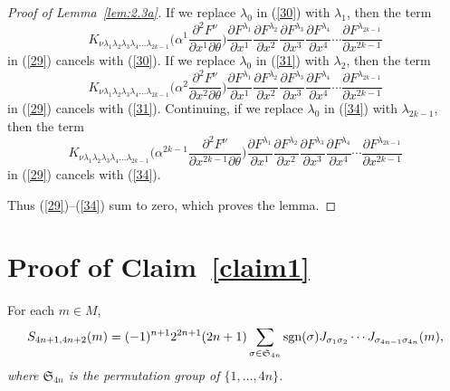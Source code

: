 \documentclass[10pt,a4paper]{amsart}
\numberwithin{equation}{section}
\theoremstyle{definition}
\newcommand{\sgn}{{\rm sgn}}
\begin{document}
\begin{proof}[Proof of Lemma~\ref{lem:2.3a}]
If we replace $\lambda_0$ in (\ref{30}) with $\lambda_1$, then the term
\[K_{\nu\lambda_1\lambda_2\lambda_3\lambda_4\dots\lambda_{2k-1}}\biggl(\alpha^1 \frac{\partial^2F^\nu}{\partial x^1\partial\theta}\biggr)\frac{\partial F^{\lambda_1}}{\partial x^1}\frac{\partial F^{\lambda_2}}{\partial x^2}
\frac{\partial F^{\lambda_3}}{\partial x^3}\frac{\partial F^{\lambda_4}}{\partial x^4}\cdots
\frac{\partial F^{\lambda_{2k-1}}}{\partial x^{2k-1}}\]
in (\ref{29}) cancels with (\ref{30}).
If we replace $\lambda_0$ in (\ref{31}) with $\lambda_2$, then the term
\[K_{\nu\lambda_1\lambda_2\lambda_3\lambda_4\dots\lambda_{2k-1}}\biggl(\alpha^2 \frac{\partial^2F^\nu}{\partial x^2\partial\theta}\biggr)\frac{\partial F^{\lambda_1}}{\partial x^1}\frac{\partial F^{\lambda_2}}{\partial x^2}
\frac{\partial F^{\lambda_3}}{\partial x^3}\frac{\partial F^{\lambda_4}}{\partial x^4}\cdots
\frac{\partial F^{\lambda_{2k-1}}}{\partial x^{2k-1}}\]
in (\ref{29}) cancels with (\ref{31}).
Continuing, if we replace $\lambda_0$ in (\ref{34}) with $\lambda_{2k-1}$, then the term
\[K_{\nu\lambda_1\lambda_2\lambda_3\lambda_4\dots\lambda_{2k-1}}\biggl(\alpha^{2k-1} \frac{\partial^2F^\nu}{\partial x^{2k-1}\partial\theta}\biggr)\frac{\partial F^{\lambda_1}}{\partial x^1}\frac{\partial F^{\lambda_2}}{\partial x^2}
\frac{\partial F^{\lambda_3}}{\partial x^3}\frac{\partial F^{\lambda_4}}{\partial x^4}\cdots
\frac{\partial F^{\lambda_{2k-1}}}{\partial x^{2k-1}}\]
in (\ref{29}) cancels with (\ref{34}).

Thus (\ref{29})--(\ref{34}) sum to zero, which proves the lemma.
\end{proof}

\section{Proof of Claim~\ref{claim1}}\label{app:claim}

 For each $m\in M$,
\begin{equation}\label{Seqn1}
S_{4n+1,4n+2}(m) =
(-1)^{n+1} 2^{2n+1}(2n+1)
\sum_{\sigma \in \mathfrak S_{4n}} \sgn(\sigma) J_{\sigma_1 \sigma_2} \cdots J_{\sigma_{4n-1} \sigma_{4n}}(m),
\end{equation}
{\it where $\mathfrak S_{4n}$ is the permutation group of $\{1,\dots, 4n\}$.}
\end{document}
